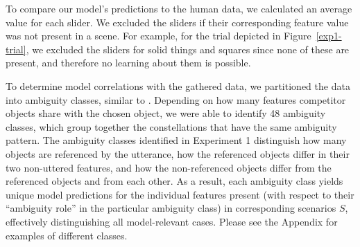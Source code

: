 \documentclass[11pt,a4paper]{article}
\begin{document}
To compare our model's predictions to the human data, we calculated an average value for each slider.
We excluded the sliders if their corresponding feature value was not present in a scene. For example, for the trial depicted in Figure~\ref{exp1-trial}, we excluded the sliders for solid things and squares since none of these are present, and therefore no learning about them is possible.

To determine model correlations with the gathered data, we partitioned the data into ambiguity classes, similar to . Depending on how many features competitor objects share with the chosen object, we were able to identify 48 ambiguity classes, which group together the constellations that have the same ambiguity pattern. The ambiguity classes identified in Experiment 1 distinguish how many objects are referenced by the utterance, how the referenced objects differ in their two non-uttered features, and how the non-referenced objects differ from the referenced objects and from each other.
As a result, each ambiguity class yields unique model predictions for the individual features present (with respect to their ``ambiguity role'' in the particular ambiguity class) in corresponding scenarios $S$, effectively distinguishing all model-relevant cases. Please see the Appendix for examples of different classes.


\end{document}
